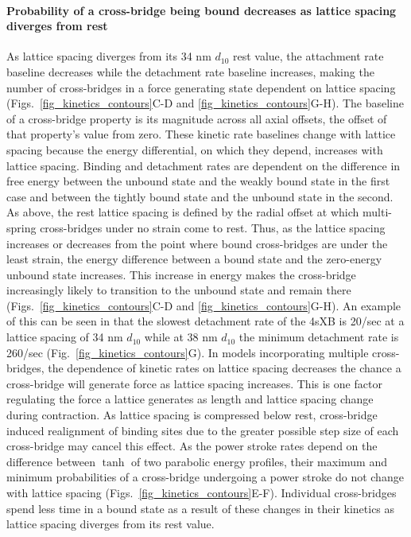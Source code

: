 \documentclass[]{article}
\begin{document}
\paragraph{Probability of a cross-bridge being bound decreases as lattice spacing diverges from rest} %
As lattice spacing diverges from its 34 nm $d_{10}$ rest value, the attachment rate baseline decreases while the detachment rate baseline increases, making the number of cross-bridges in a force generating state dependent on lattice spacing (Figs.~\ref{fig_kinetics_contours}C-D and \ref{fig_kinetics_contours}G-H). 
The baseline of a cross-bridge property is its magnitude across all axial offsets, the offset of that property's value from zero. 
These kinetic rate baselines change with lattice spacing because the energy differential, on which they depend, increases with lattice spacing.
Binding and detachment rates are dependent on the difference in free energy between the unbound state and the weakly bound state in the first case and between the tightly bound state and the unbound state in the second.
As above, the rest lattice spacing is defined by the radial offset at which multi-spring cross-bridges under no strain come to rest. 
Thus, as the lattice spacing increases or decreases from the point where bound cross-bridges are under the least strain, the energy difference between a bound state and the zero-energy unbound state increases. 
This increase in energy makes the cross-bridge increasingly likely to transition to the unbound state and remain there (Figs.~\ref{fig_kinetics_contours}C-D and  \ref{fig_kinetics_contours}G-H). 
An example of this can be seen in that the slowest detachment rate of the 4sXB is 20/sec at a lattice spacing of 34 nm $d_{10}$ while at 38 nm $d_{10}$ the minimum detachment rate is 260/sec (Fig.~\ref{fig_kinetics_contours}G).
In models incorporating multiple cross-bridges, the dependence of kinetic rates on lattice spacing decreases the chance a cross-bridge will generate force as lattice spacing increases. 
This is one factor regulating the force a lattice generates as length and lattice spacing change during contraction.
As lattice spacing is compressed below rest, cross-bridge induced realignment of binding sites due to the greater possible step size of each cross-bridge may cancel this effect.
As the power stroke rates depend on the difference between $\tanh$ of two parabolic energy profiles, their maximum and minimum probabilities of a cross-bridge undergoing a power stroke do not change with lattice spacing (Figs.~\ref{fig_kinetics_contours}E-F). 
Individual cross-bridges spend less time in a bound state as a result of these changes in their kinetics as lattice spacing diverges from its rest value.
\end{document}
